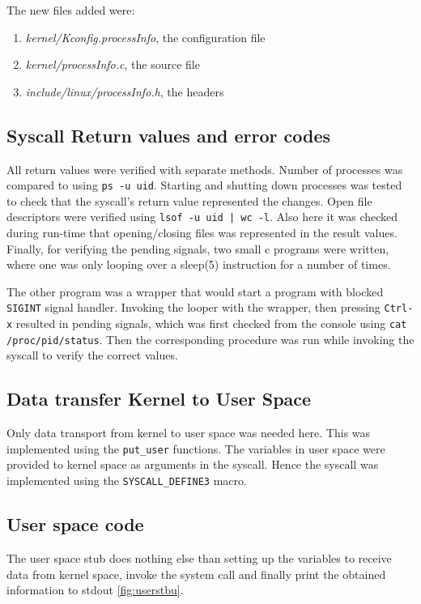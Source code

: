 \documentclass[a4paper,11pt,twoside]{article}
\begin{document}
The new files added were:
\begin{enumerate}
  \item \textit{kernel/Kconfig.processInfo}, the configuration file
  \item \textit{kernel/processInfo.c}, the source file
  \item \textit{include/linux/processInfo.h}, the headers
\end{enumerate}

\subsection{Syscall Return values and error codes}
All return values were verified with separate methods. Number of processes was
compared to using \verb+ps -u uid+. Starting and shutting down processes was
tested to check that the syscall's return value represented the changes.
Open file descriptors were verified using \verb+lsof -u uid | wc -l+. Also here
it was checked during run-time that opening/closing files was represented in the
result values.
Finally, for verifying the pending signals, two small c programs were written,
where one was only looping over a sleep(5) instruction for a number of times.

The other program was a wrapper that would start a program with blocked
\verb+SIGINT+ signal handler. Invoking the looper with the wrapper, then
pressing \verb+Ctrl-x+ resulted in pending signals, which was first checked from
the console using \verb+cat /proc/pid/status+. Then the corresponding procedure
was run while invoking the syscall to verify the correct values.


\subsection{Data transfer Kernel to User Space}
Only data transport from kernel to user space was needed here. This was
implemented using the \verb+put_user+ functions. The variables in user space
were provided to kernel space as arguments in the syscall. Hence
the syscall was implemented using the \verb'SYSCALL_DEFINE3' macro.

\subsection{User space code}
The user space stub does nothing else than setting up the variables to
receive data from kernel space, invoke the system call and finally print
the obtained information to stdout \ref{fig:userstbu}.
\end{document}
